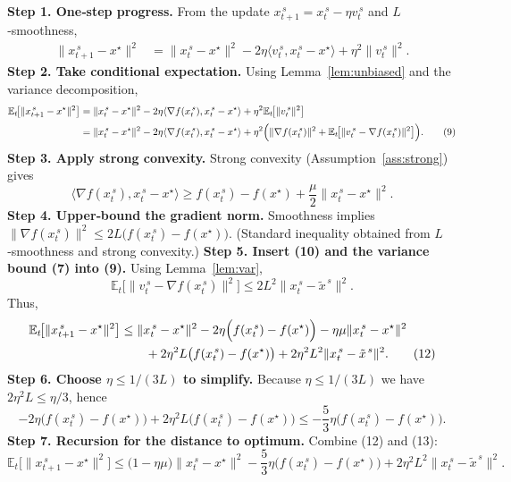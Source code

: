 \documentclass{article}
\newcommand{\E}{\mathbb{E}}
\begin{document}
\noindent\textbf{Step 1. One‑step progress.}  
From the update $x_{t+1}^{\,s}=x_t^{\,s}-\eta v_t^{\,s}$ and $L$‑smoothness,
\[
\begin{aligned}
\|x_{t+1}^{\,s}-x^\star\|^{2}
&=\|x_t^{\,s}-x^\star\|^{2}
-2\eta\langle v_t^{\,s},x_t^{\,s}-x^\star\rangle
+\eta^{2}\|v_t^{\,s}\|^{2}. \tag{8}
\end{aligned}
\]
\noindent\textbf{Step 2. Take conditional expectation.}  
Using Lemma~\ref{lem:unbiased} and the variance decomposition,
\[
\begin{aligned}
\E_t\!\bigl[\|x_{t+1}^{\,s}-x^\star\|^{2}\bigr]
&= \|x_t^{\,s}-x^\star\|^{2}
-2\eta\langle \nabla f(x_t^{\,s}),x_t^{\,s}-x^\star\rangle
+\eta^{2}\E_t\!\bigl[\|v_t^{\,s}\|^{2}\bigr] \\[0.2em]
&= \|x_t^{\,s}-x^\star\|^{2}
-2\eta\langle \nabla f(x_t^{\,s}),x_t^{\,s}-x^\star\rangle
+\eta^{2}\Bigl(\|\nabla f(x_t^{\,s})\|^{2}
+\E_t\!\bigl[\|v_t^{\,s}-\nabla f(x_t^{\,s})\|^{2}\bigr]\Bigr). \tag{9}
\end{aligned}
\]
\noindent\textbf{Step 3. Apply strong convexity.}  
Strong convexity (Assumption~\ref{ass:strong}) gives
\[
\langle \nabla f(x_t^{\,s}),x_t^{\,s}-x^\star\rangle\ge
f(x_t^{\,s})-f(x^\star)+\frac{\mu}{2}\|x_t^{\,s}-x^\star\|^{2}. \tag{10}
\]
\noindent\textbf{Step 4. Upper‑bound the gradient norm.}  
Smoothness implies $\|\nabla f(x_t^{\,s})\|^{2}\le 2L\bigl( f(x_t^{\,s})-f(x^\star)\bigr)$.  (Standard inequality obtained from $L$‑smoothness and strong convexity.)  
\noindent\textbf{Step 5. Insert (10) and the variance bound (7) into (9).}  
Using Lemma~\ref{lem:var},
\[
\E_t\!\bigl[\|v_t^{\,s}-\nabla f(x_t^{\,s})\|^{2}\bigr]
\le 2L^{2}\|x_t^{\,s}-\tilde x^{\,s}\|^{2}. \tag{11}
\]
Thus,
\[
\begin{aligned}
\E_t\!\bigl[\|x_{t+1}^{\,s}-x^\star\|^{2}\bigr]
&\le \|x_t^{\,s}-x^\star\|^{2}
-2\eta\Bigl(f(x_t^{\,s})-f(x^\star)\Bigr)
-\eta\mu\|x_t^{\,s}-x^\star\|^{2}\\
&\qquad +2\eta^{2}L\bigl(f(x_t^{\,s})-f(x^\star)\bigr)
+2\eta^{2}L^{2}\|x_t^{\,s}-\tilde x^{\,s}\|^{2}. \tag{12}
\end{aligned}
\]
\noindent\textbf{Step 6. Choose $\eta\le 1/(3L)$ to simplify.}  
Because $\eta\le 1/(3L)$ we have $2\eta^{2}L\le \eta/3$, hence
\[
-2\eta\bigl(f(x_t^{\,s})-f(x^\star)\bigr)
+2\eta^{2}L\bigl(f(x_t^{\,s})-f(x^\star)\bigr)
\le -\frac{5}{3}\eta\bigl(f(x_t^{\,s})-f(x^\star)\bigr). \tag{13}
\]
\noindent\textbf{Step 7. Recursion for the distance to optimum.}  
Combine (12) and (13):
\[
\E_t\!\bigl[\|x_{t+1}^{\,s}-x^\star\|^{2}\bigr]
\le \bigl(1-\eta\mu\bigr)\|x_t^{\,s}-x^\star\|^{2}
-\frac{5}{3}\eta\bigl(f(x_t^{\,s})-f(x^\star)\bigr)
+2\eta^{2}L^{2}\|x_t^{\,s}-\tilde x^{\,s}\|^{2}. \tag{14}
\]
\end{document}
